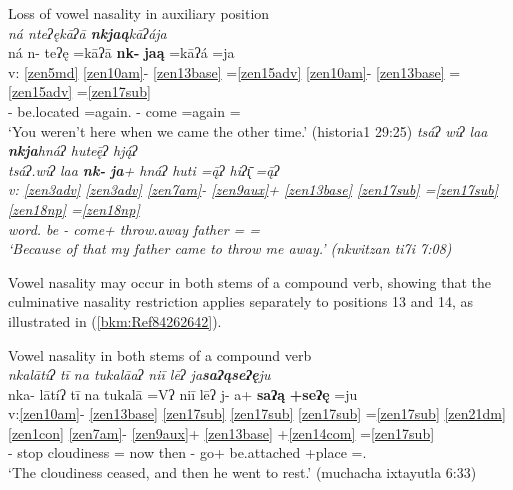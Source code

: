 \documentclass[output=paper]{langscibook}
\begin{document}
\ea\label{bkm:Ref84262486} Loss of vowel nasality in auxiliary position\\
                \ea \label{ex:key:34a}{
                \textit{ná nteʔękāʔā  \textbf{nkjaą}kāʔája}\\
                \glll {} ná n- teʔę =kāʔā  \textbf{nk-} \textbf{jaą} =kāʔá =ja\\
                v: \ref{zen5md} \ref{zen10am}{}- \ref{zen13base} =\ref{zen15adv} \ref{zen10am}{}- \ref{zen13base} =\ref{zen15adv} =\ref{zen17sub} \\ 
                {} \Neg{} \Stat{}- be.located =again.\Second\Sg{} \Pfv{}- come =again =\First\Excl{}\\
                \glt `You weren't here when we came the other time.' (historia1 29:25)
                }
                \ex\label{ex:key:34b} 
                \textit{tsáʔ wiʔ laa \textbf{nkja}hnáʔ huteę̄ʔ hją́ʔ \\  
                \glll {} tsáʔ.wiʔ laa \textbf{nk-} \textbf{ja}+ hnáʔ huti =ą̄ʔ hiʔ\={\k{ı}} =ą̄ʔ\\
                v: \ref{zen3adv} \ref{zen3adv} \ref{zen7am}{}- \ref{zen9aux}+ \ref{zen13base} \ref{zen17sub} =\ref{zen17sub} \ref{zen18np} =\ref{zen18np}\\
                {} word.\Ana{} be \Pfv{}- come+ throw.away father =\First\Sg{} \Obj{} =\First\Sg{}\\
                \glt `Because of that my father came to throw me away.' (nkwitzan ti7i 7:08)
                }
                \z 
\z 

Vowel nasality may occur in both stems of a compound verb, showing that the culminative nasality restriction applies separately to positions 13 and 14, as illustrated in (\ref{bkm:Ref84262642}).


\ea\label{bkm:Ref84262642}Vowel nasality in both stems of a compound verb\\ 
\textit{nkalātíʔ tī na tukalāaʔ niī lēʔ ja\textbf{saʔąseʔę}ju} \\ 
\glll nka- lātíʔ tī na tukalā =Vʔ niī lēʔ j- a+ \textbf{saʔą} \textbf{+seʔę} =ju\\
v:\ref{zen10am}{}- \ref{zen13base} \ref{zen17sub} \ref{zen17sub} \ref{zen17sub} =\ref{zen17sub} \ref{zen21dm} \ref{zen1con} \ref{zen7am}{}- \ref{zen9aux}+ \ref{zen13base} +\ref{zen14com} =\ref{zen17sub}\\ 
\Pfv{}- stop \Tplz{} \Def{} cloudiness =\Ana{} now then \Pfv{}- go+ be.attached +place =\Third\Sg.\M{}\\
\glt `The cloudiness ceased, and then he went to rest.'  (muchacha ixtayutla 6:33)
\z
\end{document}
